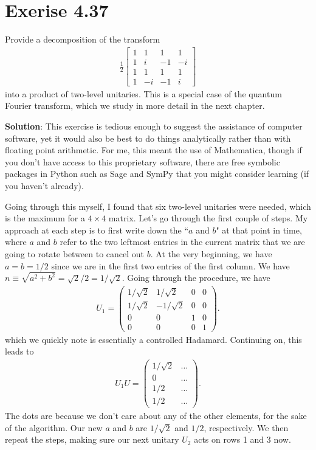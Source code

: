 \documentclass{book}
\begin{document}
\section*{Exerise 4.37}
    Provide a decomposition of the transform
    \begin{align}
        \frac{1}{2}\begin{bmatrix}
            1 & 1  & 1  & 1 \\
            1 & i  & -1 & -i \\
            1 & 1  & 1  & 1 \\
            1 & -i & -1 & i 
        \end{bmatrix}
    \end{align}
    into a product of two-level unitaries. This is a special case of the quantum Fourier transform, which we study in more detail in the next chapter. 

    \textbf{Solution}: This exercise is tedious enough to suggest the assistance of computer software, yet it would also be best to do things analytically rather than with floating point arithmetic. For me, this meant the use of Mathematica, though if you don't have access to this proprietary software, there are free symbolic packages in Python such as Sage and SymPy that you might consider learning (if you haven't already).

    Going through this myself, I found that six two-level unitaries were needed, which is the maximum for a $4\times 4$ matrix. Let's go through the first couple of steps. My approach at each step is to first write down the ``$a$ and $b$" at that point in time, where $a$ and $b$ refer to the two leftmost entries in the current matrix that we are going to rotate between to cancel out $b$. At the very beginning, we have $a = b = 1/2$ since we are in the first two entries of the first column. We have $n \equiv \sqrt{a^2 + b^2} = \sqrt{2}/2 = 1/\sqrt{2}$. Going through the procedure, we have
    \begin{align}
        U_1 = \begin{pmatrix}
            1/\sqrt{2} & 1/\sqrt{2} & 0 & 0 \\
            1/\sqrt{2} & -1/\sqrt{2} & 0 & 0 \\
            0 & 0 & 1 & 0 \\
            0 & 0 & 0 & 1
        \end{pmatrix}.
    \end{align}
    which we quickly note is essentially a controlled Hadamard. Continuing on, this leads to 
    \begin{align}
        U_1 U = \begin{pmatrix}
            1/\sqrt{2} & \dots \\
            0 & \dots \\
            1/2 & \dots \\
            1/2 & \dots
        \end{pmatrix}.
    \end{align}
    The dots are because we don't care about any of the other elements, for the sake of the algorithm. Our new $a$ and $b$ are $1/\sqrt{2}$ and $1/2$, respectively. We then repeat the steps, making sure our next unitary $U_2$ acts on rows 1 and 3 now.
\end{document}
